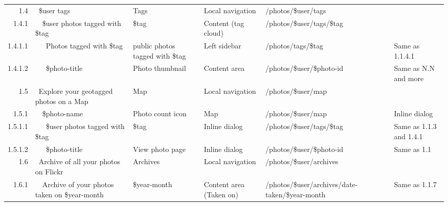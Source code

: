 \documentclass[12pt,a4paper]{article}
\begin{document}
\begin{landscape}
\begin{table}[h!b!p!]
\begin{center}
\begin{tiny}
\begin{tabular}{r|l|l|l|l|p{3cm}}
              1.4 &
              ~\$user tags &
              Tags &
              Local navigation &
              /photos/\$user/tags &
              \\

                1.4.1 &
                ~~\$user photos tagged with \$tag &
                \$tag &
                Content (tag cloud) &
                /photos/\$user/tags/\$tag &
                \\

                  1.4.1.1 &
                  ~~~Photos tagged with \$tag &
                  public photos tagged with \$tag &
                  Left sidebar &
                  /photos/tags/\$tag &
                  Same as 1.1.4.1 \\

                  1.4.1.2 &
                  ~~~\$photo-title &
                  Photo thumbnail &
                  Content area &
                  /photos/\$user/\$photo-id &
                  Same as N.N and more\\

              1.5 &
              ~Explore your geotagged photos on a Map &
              Map &
              Local navigation &
              /photos/\$user/map &
              \\

                1.5.1 &
                ~~\$photo-name &
                Photo count icon &
                Map &
                /photos/\$user/map &
                Inline dialog\\

                  1.5.1.1 &
                  ~~~\$user photos tagged with \$tag &
                  \$tag &
                  Inline dialog &
                  /photos/\$user/tags/\$tag &
                  Same as 1.1.3 and 1.4.1\\

                  1.5.1.2 &
                  ~~~\$photo-title &
                  View photo page &
                  Inline dialog &
                  /photos/\$user/\$photo-id &
                  Same as 1.1 \\

              1.6 &
              ~Archive of all your photos on Flickr &
              Archives &
              Local navigation &
              /photos/\$user/archives &
              \\

                1.6.1 &
                ~~Archive of your photos taken on \$year-month &
                \$year-month &
                Content area (Taken on) &
                /photos/\$user/archives/date-taken/\$year-month &
                Same as 1.1.7 \\


\end{tabular}
\end{tiny}
\end{center}
\end{table}
\end{landscape}
\end{document}
